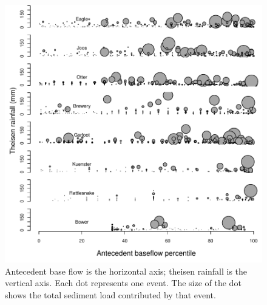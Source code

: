 \documentclass[10pt]{article}
\begin{document}
\begin{figure}
    \begin{center}
\includegraphics{loadings-figure4}
    \end{center}
    \caption{Antecedent base flow is the horizontal axis; theisen rainfall is the vertical axis. Each dot represents one event. The size of the dot shows the total sediment load contributed by that event. \label{bubbles}}
\end{figure}





\end{document}
